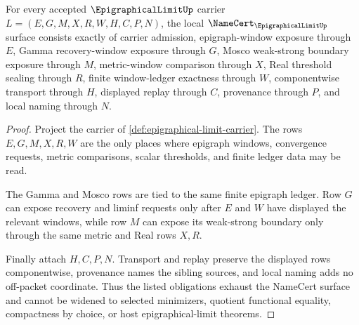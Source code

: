 \begin{theorem}
\label{thm:epigraphical-limit-namecert-obligations}
For every accepted $\EpigraphicalLimitUp$ carrier $L=(E,G,M,X,R,W,H,C,P,N)$, the local $\NameCert_{\EpigraphicalLimitUp}$ surface consists exactly of carrier admission, epigraph-window exposure through $E$, Gamma recovery-window exposure through $G$, Mosco weak-strong boundary exposure through $M$, metric-window comparison through $X$, Real threshold sealing through $R$, finite window-ledger exactness through $W$, componentwise transport through $H$, displayed replay through $C$, provenance through $P$, and local naming through $N$.
\end{theorem}
\begin{proof}
Project the carrier of \autoref{def:epigraphical-limit-carrier}. The rows $E,G,M,X,R,W$ are the only places where epigraph windows, convergence requests, metric comparisons, scalar thresholds, and finite ledger data may be read.

The Gamma and Mosco rows are tied to the same finite epigraph ledger. Row $G$ can expose recovery and liminf requests only after $E$ and $W$ have displayed the relevant windows, while row $M$ can expose its weak-strong boundary only through the same metric and Real rows $X,R$.

Finally attach $H,C,P,N$. Transport and replay preserve the displayed rows componentwise, provenance names the sibling sources, and local naming adds no off-packet coordinate. Thus the listed obligations exhaust the NameCert surface and cannot be widened to selected minimizers, quotient functional equality, compactness by choice, or host epigraphical-limit theorems.
\end{proof}

